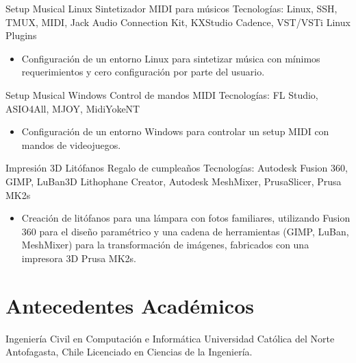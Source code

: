 \documentclass[12pt,letterpaper,sans]{moderncv}
\begin{document}
\cventry{}
{Setup Musical Linux}
{Sintetizador MIDI para músicos}
{\newline Tecnologías: Linux, SSH, TMUX, MIDI, Jack Audio Connection Kit, KXStudio Cadence, VST/VSTi Linux Plugins}
{\newline}
{
  \begin{itemize}
    \item Configuración de un entorno Linux para sintetizar música con mínimos requerimientos y cero configuración por parte del usuario.
  \end{itemize}
}
\vspace{0.5em}

\cventry{}
{Setup Musical Windows}
{Control de mandos MIDI}
{\newline Tecnologías: FL Studio, ASIO4All, MJOY, MidiYokeNT}
{\newline}
{
  \begin{itemize}
    \item Configuración de un entorno Windows para controlar un setup MIDI con mandos de videojuegos.
  \end{itemize}
}
\vspace{0.5em}

\cventry{}
{Impresión 3D Litófanos}
{Regalo de cumpleaños}
{\newline Tecnologías: Autodesk Fusion 360, GIMP, LuBan3D Lithophane Creator, Autodesk MeshMixer, PrusaSlicer, Prusa MK2s}
{\newline}
{
  \begin{itemize}
    \item Creación de litófanos para una lámpara con fotos familiares, utilizando Fusion 360 para el diseño paramétrico y una cadena de herramientas (GIMP, LuBan, MeshMixer) para la transformación de imágenes, fabricados con una impresora 3D Prusa MK2s.
  \end{itemize}
}
\vspace{0.5em}

\newpage

\section{Antecedentes Académicos}
{Ingeniería Civil en Computación e Informática}
{Universidad Católica del Norte}
{\newline Antofagasta, Chile}
{\newline Licenciado en Ciencias de la Ingeniería.}
{}
\end{document}
